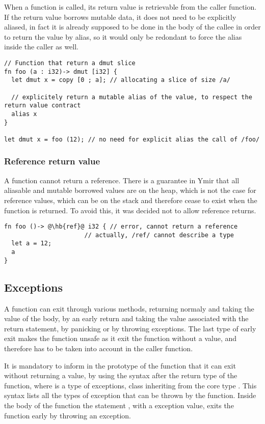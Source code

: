 When a function is called, its return value is retrievable from the caller
function. If the return value borrows mutable data, it does not need to be
explicitly aliased, in fact it is already supposed to be done in the body of the
callee in order to return the value by alias, so it would only be redondant to
force the alias inside the caller as well.

\begin{lstlisting}[style=coloredverbatim]
// Function that return a dmut slice
fn foo (a : i32)-> dmut [i32] {
  let dmut x = copy [0 ; a]; // allocating a slice of size /a/

  // explicitely return a mutable alias of the value, to respect the return value contract
  alias x
}

let dmut x = foo (12); // no need for explicit alias the call of /foo/
\end{lstlisting}

\subsubsection {Reference return value}

A function cannot return a reference. There is a guarantee in Ymir that all
aliasable and mutable borrowed values are on the heap, which is not the case for
reference values, which can be on the stack and therefore cease to exist when
the function is returned. To avoid this, it was decided not to allow reference
returns.

\begin{lstlisting}[style=coloredverbatim, escapechar=@]
fn foo ()-> @\hb{ref}@ i32 { // error, cannot return a reference
                      // actually, /ref/ cannot describe a type
  let a = 12;
  a
}
\end{lstlisting}

\subsection {Exceptions}

A function can exit through various methods, returning normaly and taking the
value of the body, by an early return and taking the value associated with the
return statement, by panicking or by throwing exceptions. The last type of early
exit makes the function unsafe as it exit the function without a value, and
therefore has to be taken into account in the caller function.

It is mandatory to inform in the prototype of the function that it can exit
without returning a value, by using the syntax  after
the return type of the function, where  is a type of exceptions, class
inheriting from the core type . This syntax
lists all the types of exception that can be thrown by the function. Inside the
body of the function the statement , with  a
exception value, exits the function early by throwing an exception.

